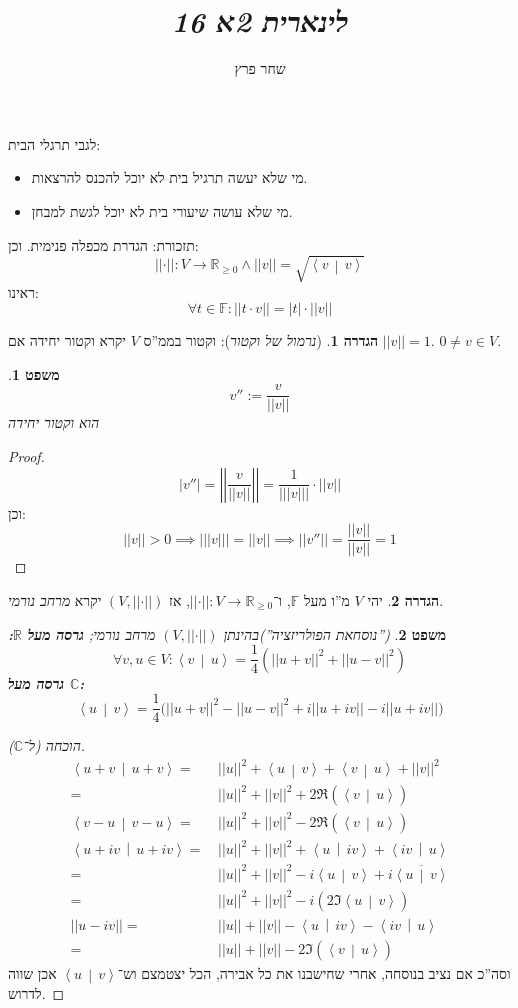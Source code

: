 \documentclass[]{article}
\author{שחר פרץ}
\title{\textit{לינארית 2א 16}}
\newcommand\R     {\mathbb{R}}
\newcommand\C     {\mathbb{C}}
\newcommand\ra    {\rangle}
\newcommand\la    {\langle}
\newcommand\ol    {\overline}
\newcommand\F         {\mathbb{F}}
\newcommand\co        {\colon}
\newtheorem{Theorem}{משפט}
\theoremstyle{definition}
\newtheorem{definition}{הגדרה}
\newcommand\theo  [1] {\begin{Theorem}#1\end{Theorem}}
\newcommand\defi  [1] {\begin{definition}#1\end{definition}}
\newcommand\norm[1]   {\left \vert \left \vert #1 \right \vert \right \vert}
\newcommand\snorm     {\left \vert \left \vert \cdot \right \vert \right \vert}
\newcommand\mut[2]    {\left \la #1 \,\middle\vert\, #2 \right \ra}
\begin{document}
    \maketitle
    לגבי תרגלי הבית: 
    \begin{itemize}
        \item מי שלא יעשה תרגיל בית לא יוכל להכנס להרצאות. 
        \item מי שלא עושה שיעורי בית לא יוכל לגשת למבחן. 
    \end{itemize}
    
    תזכורת: הגדרת מכפלה פנימית. 
    וכן: 
    \[ \snorm \co V \to \R_{\ge 0} \land \norm{v} = \sqrt{\mut{v}{v}} \]
    ראינו: 
    \[ \forall t \in \F \co \norm{t \cdot v} = |t| \cdot \norm{v} \]
    \defi{(\textit{נרמול של וקטור}): וקטור בממ''ס $V$ יקרא וקטור יחידה אם $\norm{v} = 1$.  $0 \neq v \in V$. }
    \theo{\[ v'' := \frac{v}{\norm{v}} \] הוא וקטור יחידה}
    \begin{proof}
        \[ |v''| = \norm{\frac{v}{\norm{v}}} = \frac{1}{|\norm{v}|} \cdot \norm{v} \]
        וכן: 
        \[ \norm{v} > 0 \implies |\norm{v}| = \norm{v} \implies \norm{v''} = \frac{\norm{v}}{\norm{v}} = 1 \]
    \end{proof}
    \defi{יהי $V$ מ''ו מעל $\F$, ו־$\snorm \co V \to \R_{\ge 0}$, אז $(V, \snorm)$ יקרא \textit{מרחב נורמי}. }
    \theo{(\textit{''נוסחאת הפולריזציה'')}בהינתן $(V, \snorm)$ מרחב נורמי;
    \textbf{גרסה מעל $\R$: }
    \[ \forall v, u \in V \co \mut{v}{u} = \frac{1}{4}(\norm{u + v}^2 + \norm{u - v}^2) \]
    \textbf{גרסה מעל $\C$: }
    \[ \mut{u}{v} = \frac{1}{4}\Big(\norm{u + v}^2 - \norm{u - v}^2 + i\norm{u + iv} - i\norm{u + iv}\Big) \]
    }
   \begin{proof}[הוכחה (ל־$\C$)]
        \begin{align*}
            \mut{u + v}{u + v} =\,& \norm{u}^2 + \mut{u}{v} + \mut{v}{u} + \norm{v}^2 \\
            =\,& \norm{u}^2 + \norm{v}^2 + 2\Re(\mut{v}{u}) \\
            \mut{v - u}{v - u} = \, & \norm{u}^2 + \norm{v}^2 - 2\Re(\mut{v}{u}) \\
            \mut{u + iv}{u + iv} =\,& \norm{u}^2 + \norm{v}^2 + \mut{u}{iv} + \mut{iv}{u}  \\
            =\,& \norm{u}^2 + \norm{v}^2 - i\mut{u}{v} + i\ol{\mut{u}{v}} \\
            =\,& \norm{u}^2 + \norm{v}^2 - i(2 \Im\mut{u}{v}) \\
            \norm{u - iv} =\,& \norm{u} + \norm{v} - \mut{u}{iv} - \mut{iv}{u} \\
            =\,& \norm{u} + \norm{v} - 2\Im(\mut{v}{u})
        \end{align*}
        וסה''כ אם נציב בנוסחה, אחרי שחישבנו את כל אבירה, הכל יצטמצם וש־$\mut{u}{v}$ אכן שווה לדרוש. 
    \end{proof}
    
\end{document}

